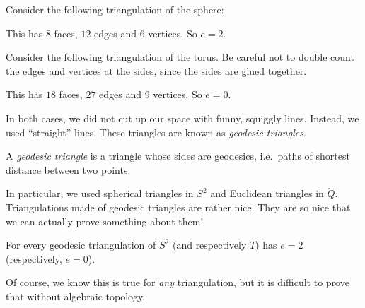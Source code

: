 \documentclass[a4paper]{article}
\begin{document}
\begin{eg}
  Consider the following triangulation of the sphere:
  \begin{center}
  \end{center}
  This has $8$ faces, $12$ edges and $6$ vertices. So $e = 2$.
\end{eg}

\begin{eg}
  Consider the following triangulation of the torus. Be careful not to double count the edges and vertices at the sides, since the sides are glued together.
  \begin{center}
  \end{center}
  This has $18$ faces, $27$ edges and $9$ vertices. So $e = 0$.
\end{eg}
In both cases, we did not cut up our space with funny, squiggly lines. Instead, we used ``straight'' lines. These triangles are known as \emph{geodesic triangles}.

\begin{defi}
  A \emph{geodesic triangle} is a triangle whose sides are geodesics, i.e.\ paths of shortest distance between two points.
\end{defi}
In particular, we used spherical triangles in $S^2$ and Euclidean triangles in $\mathring{Q}$. Triangulations made of geodesic triangles are rather nice. They are so nice that we can actually prove something about them!
\begin{prop}
  For every geodesic triangulation of $S^2$ (and respectively $T$) has $e = 2$ (respectively, $e = 0$).
\end{prop}
Of course, we know this is true for \emph{any} triangulation, but it is difficult to prove that without algebraic topology.
\end{document}
